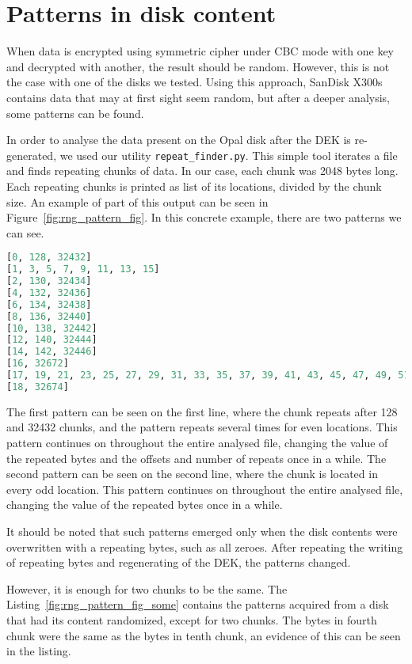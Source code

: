 \appendix

\chapter{Patterns in disk content}
\label{appendix:rng_pattern}

When data is encrypted using symmetric cipher under CBC mode with one key and decrypted with another, the result should be random.
However, this is not the case with one of the disks we tested. Using this approach, SanDisk X300s contains data that may at first sight seem random, but after a deeper analysis, some patterns can be found.

In order to analyse the data present on the Opal disk after the DEK is re-generated, we used our utility \verb|repeat_finder.py|. This simple tool iterates a file and finds repeating chunks of data. In our case, each chunk was 2048 bytes long. Each repeating chunks is printed as list of its locations, divided by the chunk size. An example of part of this output can be seen in Figure~\ref{fig:rng_pattern_fig}. In this concrete example, there are two patterns we can see.

\begin{lstlisting}[caption={Found patterns on zeroed disk},label={fig:rng_pattern_fig},language=Python]
[0, 128, 32432]
[1, 3, 5, 7, 9, 11, 13, 15]
[2, 130, 32434]
[4, 132, 32436]
[6, 134, 32438]
[8, 136, 32440]
[10, 138, 32442]
[12, 140, 32444]
[14, 142, 32446]
[16, 32672]
[17, 19, 21, 23, 25, 27, 29, 31, 33, 35, 37, 39, 41, 43, 45, 47, 49, 51, 53, 55]
[18, 32674]
    \end{lstlisting}
The first pattern can be seen on the first line, where the chunk repeats after 128 and 32432 chunks, and the pattern repeats several times for even locations. This pattern continues on throughout the entire analysed file, changing the value of the repeated bytes and the offsets and number of  repeats  once in a while.
The second pattern can be seen on the second line, where the chunk is located in every odd location. This pattern continues on throughout the entire analysed file, changing the value of the repeated bytes once in a while.

It should be noted that such patterns emerged only when the disk contents were overwritten with a repeating bytes, such as all zeroes. After repeating the writing of repeating bytes and regenerating of the DEK, the patterns changed. 

However, it is enough for two chunks to be the same. The Listing~\ref{fig:rng_pattern_fig_some} contains the patterns acquired from a disk that had its content randomized, except for two chunks. The bytes in fourth chunk were the same as the bytes in tenth chunk, an evidence of this can be seen in the listing.

